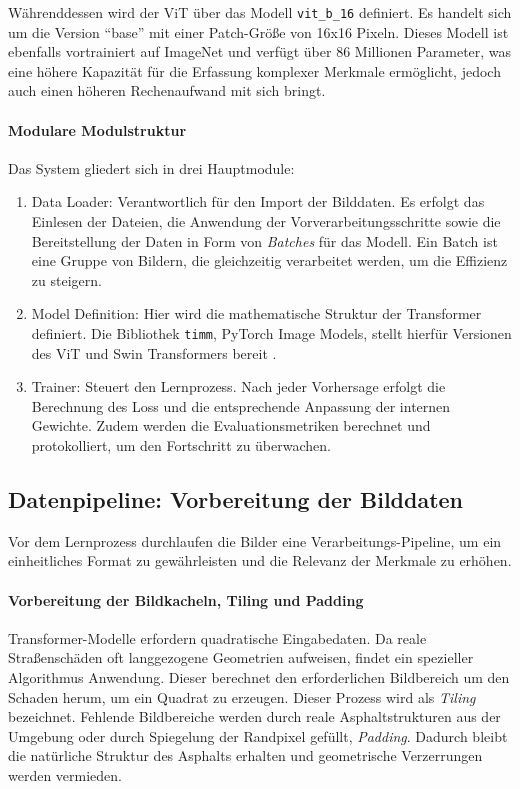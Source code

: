 Währenddessen wird der ViT über das Modell \texttt{vit\_b\_16} definiert. Es handelt sich um die Version "`base"' mit einer Patch-Größe von 16x16 Pixeln. Dieses Modell ist ebenfalls vortrainiert auf ImageNet und verfügt über 86 Millionen Parameter, was eine höhere Kapazität für die Erfassung komplexer Merkmale ermöglicht, jedoch auch einen höheren Rechenaufwand mit sich bringt.

\paragraph{Modulare Modulstruktur}
Das System gliedert sich in drei Hauptmodule:
\begin{enumerate}
    \item Data Loader: Verantwortlich für den Import der Bilddaten. Es erfolgt das Einlesen der Dateien, die Anwendung der Vorverarbeitungsschritte sowie die Bereitstellung der Daten in Form von \emph{Batches} für das Modell. Ein Batch ist eine Gruppe von Bildern, die gleichzeitig verarbeitet werden, um die Effizienz zu steigern.
    \item Model Definition: Hier wird die mathematische Struktur der Transformer definiert. Die Bibliothek \texttt{timm}, PyTorch Image Models, stellt hierfür Versionen des ViT und Swin Transformers bereit \cite{wightman2019timm}.
    \item Trainer: Steuert den Lernprozess. Nach jeder Vorhersage erfolgt die Berechnung des Loss und die entsprechende Anpassung der internen Gewichte. Zudem werden die Evaluationsmetriken berechnet und protokolliert, um den Fortschritt zu überwachen.
\end{enumerate}

\subsection{Datenpipeline: Vorbereitung der Bilddaten}
\label{subsec:datenpipeline}

Vor dem Lernprozess durchlaufen die Bilder eine Verarbeitungs-Pipeline, um ein einheitliches Format zu gewährleisten und die Relevanz der Merkmale zu erhöhen.

\paragraph{Vorbereitung der Bildkacheln, Tiling und Padding}
Transformer-Modelle erfordern quadratische Eingabedaten. Da reale Straßenschäden oft langgezogene Geometrien aufweisen, findet ein spezieller Algorithmus Anwendung. Dieser berechnet den erforderlichen Bildbereich um den Schaden herum, um ein Quadrat zu erzeugen. Dieser Prozess wird als \emph{Tiling} bezeichnet. Fehlende Bildbereiche werden durch reale Asphaltstrukturen aus der Umgebung oder durch Spiegelung der Randpixel gefüllt, \emph{Padding}. Dadurch bleibt die natürliche Struktur des Asphalts erhalten und geometrische Verzerrungen werden vermieden.

